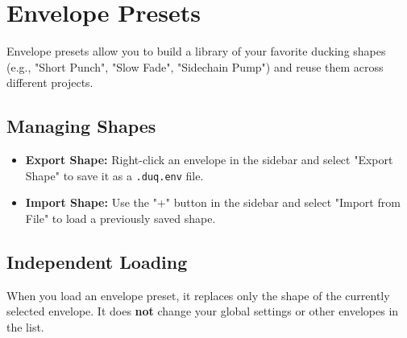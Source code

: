 \chapter{Envelope Presets}
\label{ch:envelope_presets}

Envelope presets allow you to build a library of your favorite ducking shapes (e.g., "Short Punch", "Slow Fade", "Sidechain Pump") and reuse them across different projects.

\section{Managing Shapes}
\begin{itemize}
    \item \textbf{Export Shape:} Right-click an envelope in the sidebar and select "Export Shape" to save it as a \texttt{.duq.env} file.
    \item \textbf{Import Shape:} Use the "+" button in the sidebar and select "Import from File" to load a previously saved shape.
\end{itemize}

\section{Independent Loading}
When you load an envelope preset, it replaces only the shape of the currently selected envelope. It does \textbf{not} change your global settings or other envelopes in the list.
